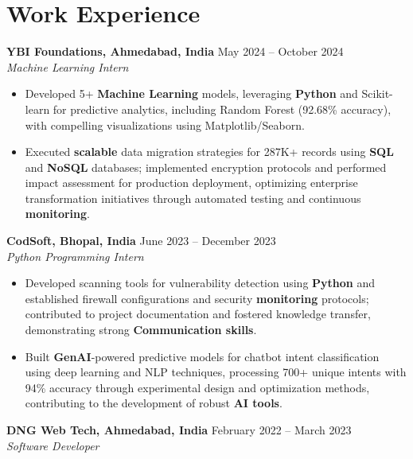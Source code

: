\documentclass[a4paper,10pt]{article}
\begin{document}
\section*{Work Experience}
\textbf{YBI Foundations, Ahmedabad, India} \hfill May 2024 -- October 2024\\
\textit{Machine Learning Intern} \\
\begin{itemize}[leftmargin=*, itemsep=0pt, parsep=1pt]
\vspace{-6mm}
\item Developed 5+ \textbf{Machine Learning} models, leveraging \textbf{Python} and Scikit-learn for predictive analytics, including Random Forest (92.68\% accuracy), with compelling visualizations using Matplotlib/Seaborn.
\item Executed \textbf{scalable} data migration strategies for 287K+ records using \textbf{SQL} and \textbf{NoSQL} databases; implemented encryption protocols and performed impact assessment for production deployment, optimizing enterprise transformation initiatives through automated testing and continuous \textbf{monitoring}.
\end{itemize}
\textbf{CodSoft, Bhopal, India} \hfill June 2023 -- December 2023\\
\textit{Python Programming Intern} \\
\begin{itemize}[leftmargin=*, itemsep=0pt, parsep=1pt]
\vspace{-6mm}
\item Developed scanning tools for vulnerability detection using \textbf{Python} and established firewall configurations and security \textbf{monitoring} protocols; contributed to project documentation and fostered knowledge transfer, demonstrating strong \textbf{Communication skills}.
\item Built \textbf{GenAI}-powered predictive models for chatbot intent classification using deep learning and NLP techniques, processing 700+ unique intents with 94\% accuracy through experimental design and optimization methods, contributing to the development of robust \textbf{AI tools}.
\vspace{-1mm}
\end{itemize}

\textbf{DNG Web Tech, Ahmedabad, India} \hfill February 2022 -- March 2023 \\
\textit{Software Developer} \\
\end{document}
